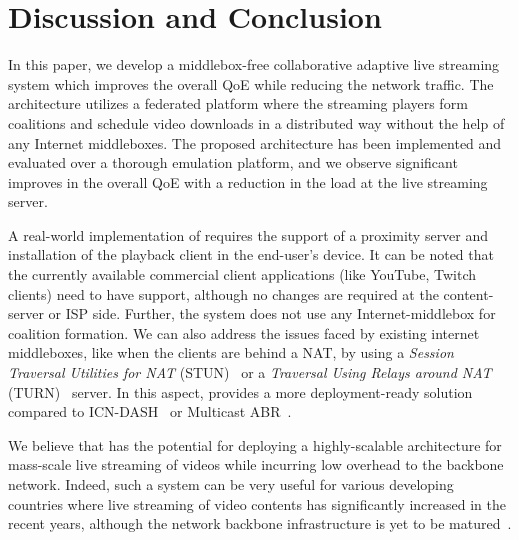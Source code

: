 \section{Discussion and Conclusion}
In this paper, we develop a middlebox-free collaborative adaptive live streaming system which improves the overall QoE while reducing the network traffic. The architecture utilizes a federated platform where the streaming players form coalitions and schedule video downloads in a distributed way without the help of any Internet middleboxes. The proposed architecture has been implemented and evaluated over a thorough emulation platform, and we observe significant improves in the overall QoE with a reduction in the load at the live streaming server. 

A real-world implementation of {\our} requires the support of a proximity server and installation of the playback client in the end-user's device. It can be noted that the currently available commercial client applications (like YouTube, Twitch clients) need to have {\our} support, although no changes are required at the content-server or ISP side. Further, the system does not use any Internet-middlebox for coalition formation. We can also address the issues faced by existing internet middleboxes, like when the clients are behind a NAT, by using a \textit{Session Traversal Utilities for NAT} (STUN)~\cite{rfc5389_stun} or a \textit{Traversal Using Relays around NAT} (TURN)~\cite{rfc5766_turn} server. In this aspect, {\our} provides a more deployment-ready solution compared to ICN-DASH~\cite{ICN-DASH} or Multicast ABR~\cite{multicastAbrCablelabs}.

We believe that {\our} has the potential for deploying a highly-scalable architecture for mass-scale live streaming of videos while incurring low overhead to the backbone network. Indeed, such a system can be very useful for various developing countries where live streaming of video contents has significantly increased in the recent years, although the network backbone infrastructure is yet to be matured~\cite{kiedanski2019youtube}.
